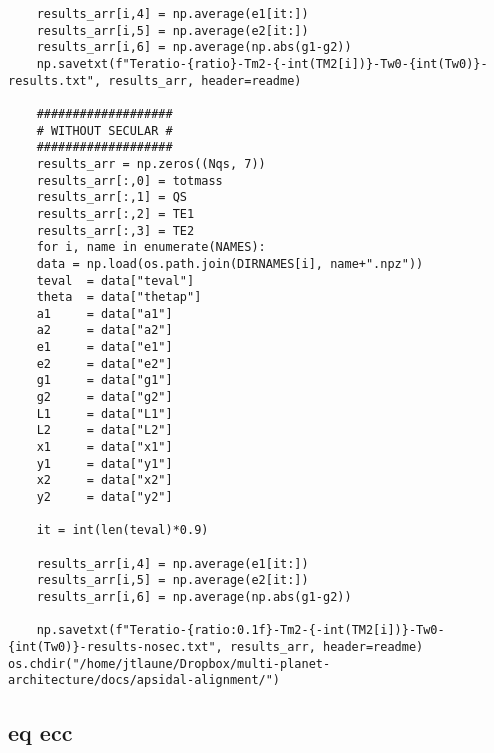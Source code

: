 \documentclass[11pt]{article}
\begin{document}
\begin{verbatim}
	results_arr[i,4] = np.average(e1[it:])
	results_arr[i,5] = np.average(e2[it:])
	results_arr[i,6] = np.average(np.abs(g1-g2))
    np.savetxt(f"Teratio-{ratio}-Tm2-{-int(TM2[i])}-Tw0-{int(Tw0)}-results.txt", results_arr, header=readme)

    ###################
    # WITHOUT SECULAR #
    ###################
    results_arr = np.zeros((Nqs, 7))
    results_arr[:,0] = totmass
    results_arr[:,1] = QS
    results_arr[:,2] = TE1
    results_arr[:,3] = TE2
    for i, name in enumerate(NAMES):
	data = np.load(os.path.join(DIRNAMES[i], name+".npz"))
	teval  = data["teval"]
	theta  = data["thetap"]
	a1     = data["a1"]
	a2     = data["a2"]
	e1     = data["e1"]
	e2     = data["e2"]
	g1     = data["g1"]
	g2     = data["g2"]
	L1     = data["L1"]
	L2     = data["L2"]
	x1     = data["x1"]
	y1     = data["y1"]
	x2     = data["x2"]
	y2     = data["y2"]

	it = int(len(teval)*0.9)

	results_arr[i,4] = np.average(e1[it:])
	results_arr[i,5] = np.average(e2[it:])
	results_arr[i,6] = np.average(np.abs(g1-g2))

    np.savetxt(f"Teratio-{ratio:0.1f}-Tm2-{-int(TM2[i])}-Tw0-{int(Tw0)}-results-nosec.txt", results_arr, header=readme)
os.chdir("/home/jtlaune/Dropbox/multi-planet-architecture/docs/apsidal-alignment/")
\end{verbatim}

\subsection{eq ecc}
\label{sec:org4742834}
\end{document}
